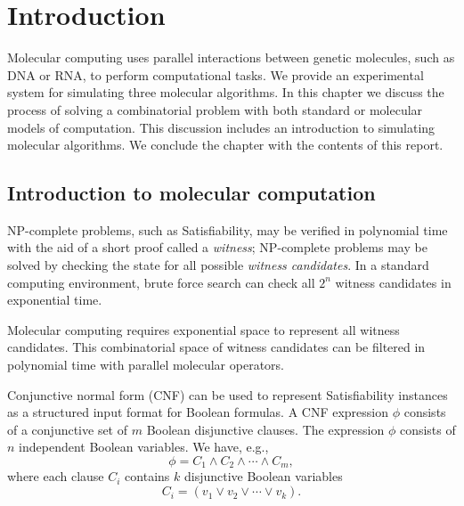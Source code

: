 \chapter{Introduction}


Molecular computing uses parallel interactions between genetic molecules, such as DNA or RNA, to perform computational tasks.  We provide an experimental system for simulating three molecular algorithms.  In this chapter we discuss the process of solving a combinatorial problem with both standard or molecular models of computation.  This discussion includes an introduction to simulating molecular algorithms.  We conclude the chapter with the contents of this report.

\section{Introduction to molecular computation}
	
				
\textsf{NP-complete} problems, such as {\sc Satisfiability}, may be verified in polynomial time with the aid of a short proof called a \textit{witness}; \textsf{NP-complete} problems may be solved by checking the state for all possible \textit{witness candidates}.  In a standard computing environment, brute force search can check all $2^n$ witness candidates in exponential time.

Molecular computing requires exponential space to represent all witness candidates.  This combinatorial space of witness candidates can be filtered in polynomial time with parallel molecular operators.

Conjunctive normal form (CNF) can be used to represent {\sc Satisfiability} instances as a structured input format for Boolean formulas.  A CNF expression $\phi$ consists of a conjunctive set of $m$ Boolean disjunctive clauses.  The expression $\phi$ consists of $n$ independent Boolean variables.  We have, e.g.,
\[
\phi = C_1 \wedge C_2 \wedge \cdots \wedge C_m, 
\]
where each clause $C_i$ contains $k$ disjunctive Boolean variables
\[
C_i = (v_1 \vee v_2 \vee \cdots \vee v_k).
\]

